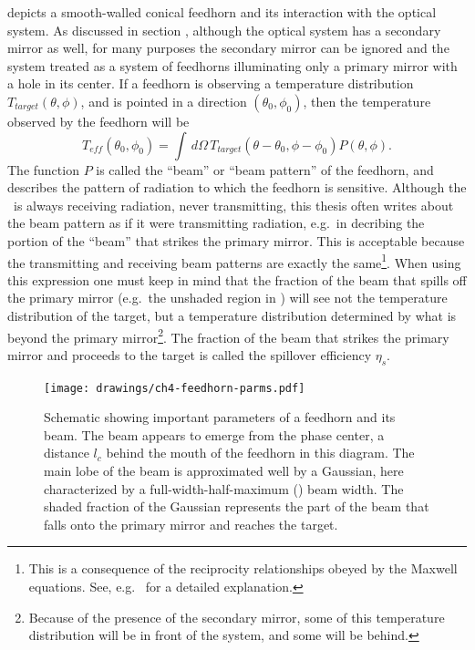  depicts a smooth-walled conical feedhorn and its interaction with the optical system.
As discussed in section , although the optical system has a secondary mirror as well, for many purposes the secondary mirror can be ignored and the system treated as a system of feedhorns illuminating only a primary mirror with a hole in its center.
If a feedhorn is observing a temperature distribution $T_{target}(\theta,\phi)$, and is pointed in a direction $(\theta_0, \phi_0)$, then the temperature observed by the feedhorn will be
\begin{equation}
    T_{eff}(\theta_0,\phi_0) = \int \, d \Omega \, T_{target}(\theta - \theta_0,\phi - \phi_0) P(\theta,\phi).
\end{equation}
The function $P$ is called the ``beam'' or ``beam pattern'' of the feedhorn, and describes the pattern of radiation to which the feedhorn is sensitive.
Although the \Imager\ is always receiving radiation, never transmitting, this thesis often writes about the beam pattern as if it were transmitting radiation, e.g.\ in decribing the portion of the ``beam'' that strikes the primary mirror.
This is acceptable because the transmitting and receiving beam patterns are exactly the same\footnote{This is a consequence of the reciprocity relationships obeyed by the Maxwell equations. See, e.g.\ \cite{balanis_antenna_2005} for a detailed explanation.}.
When using this expression one must keep in mind that the fraction of the beam that spills off the primary mirror (e.g.\ the unshaded region in ) will see not the temperature distribution of the target, but a temperature distribution determined by what is beyond the primary mirror\footnote{Because of the presence of the secondary mirror, some of this temperature distribution will be in front of the system, and some will be behind.}.
The fraction of the beam that strikes the primary mirror and proceeds to the target is called the spillover efficiency $\eta_s$.

\begin{figure}
\centering
\texttt{[image: drawings/ch4-feedhorn-parms.pdf]}
\caption{Schematic showing important parameters of a feedhorn and its beam. The beam appears to emerge from the phase center, a distance $l_c$ behind the mouth of the feedhorn in this diagram. The main lobe of the beam is approximated well by a Gaussian, here characterized by a full-width-half-maximum (\FWHM) beam width. The shaded fraction of the Gaussian represents the part of the beam that falls onto the primary mirror and reaches the target.}
\label{fig:feedhorn-parms}
\end{figure}

